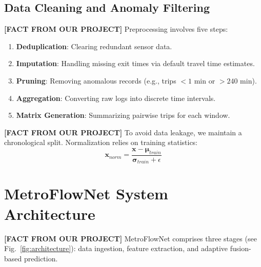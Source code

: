 \documentclass[conference]{IEEEtran}
\begin{document}
\subsection{Data Cleaning and Anomaly Filtering}
\noindent \textbf{[FACT FROM OUR PROJECT]} Preprocessing involves five steps:
\begin{enumerate}
    \item \textbf{Deduplication}: Clearing redundant sensor data.
    \item \textbf{Imputation}: Handling missing exit times via default travel time estimates.
    \item \textbf{Pruning}: Removing anomalous records (e.g., trips $<1$ min or $>240$ min).
    \item \textbf{Aggregation}: Converting raw logs into discrete time intervals.
    \item \textbf{Matrix Generation}: Summarizing pairwise trips for each window.
\end{enumerate}

\noindent \textbf{[FACT FROM OUR PROJECT]} To avoid data leakage, we maintain a chronological split. Normalization relies on training statistics:
\begin{equation}
\mathbf{x}_{norm} = \frac{\mathbf{x} - \boldsymbol{\mu}_{train}}{\boldsymbol{\sigma}_{train} + \epsilon}
\end{equation}

\section{MetroFlowNet System Architecture}
\label{sec:architecture}

\noindent \textbf{[FACT FROM OUR PROJECT]} MetroFlowNet comprises three stages (see Fig.~\ref{fig:architecture}): data ingestion, feature extraction, and adaptive fusion-based prediction.
\end{document}
